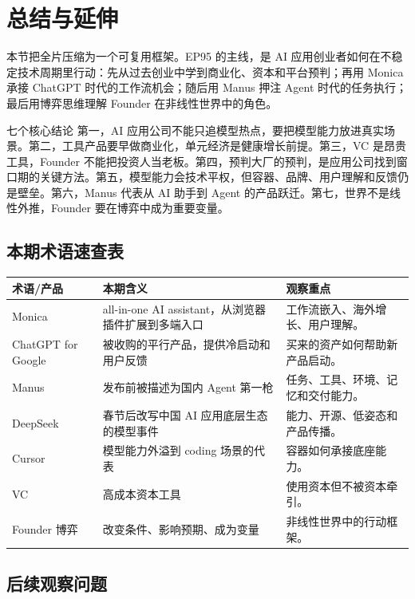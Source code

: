 \section{总结与延伸}

本节把全片压缩为一个可复用框架。EP95 的主线，是 AI 应用创业者如何在不稳定技术周期里行动：先从过去创业中学到商业化、资本和平台预判；再用 Monica 承接 ChatGPT 时代的工作流机会；随后用 Manus 押注 Agent 时代的任务执行；最后用博弈思维理解 Founder 在非线性世界中的角色。

\begin{importantbox}{七个核心结论}
第一，AI 应用公司不能只追模型热点，要把模型能力放进真实场景。第二，工具产品要早做商业化，单元经济是健康增长前提。第三，VC 是昂贵工具，Founder 不能把投资人当老板。第四，预判大厂的预判，是应用公司找到窗口期的关键方法。第五，模型能力会技术平权，但容器、品牌、用户理解和反馈仍是壁垒。第六，Manus 代表从 AI 助手到 Agent 的产品跃迁。第七，世界不是线性外推，Founder 要在博弈中成为重要变量。
\end{importantbox}

\subsection{本期术语速查表}

\noindent\begin{tabularx}{\textwidth}{p{}p{}X}
\toprule
术语/产品 & 本期含义 & 观察重点 \\
\midrule
Monica & all-in-one AI assistant，从浏览器插件扩展到多端入口 & 工作流嵌入、海外增长、用户理解。 \\
ChatGPT for Google & 被收购的平行产品，提供冷启动和用户反馈 & 买来的资产如何帮助新产品启动。 \\
Manus & 发布前被描述为国内 Agent 第一枪 & 任务、工具、环境、记忆和交付能力。 \\
DeepSeek & 春节后改写中国 AI 应用底层生态的模型事件 & 能力、开源、低姿态和产品传播。 \\
Cursor & 模型能力外溢到 coding 场景的代表 & 容器如何承接底座能力。 \\
VC & 高成本资本工具 & 使用资本但不被资本牵引。 \\
Founder 博弈 & 改变条件、影响预期、成为变量 & 非线性世界中的行动框架。 \\
\bottomrule
\end{tabularx}

\subsection{后续观察问题}

